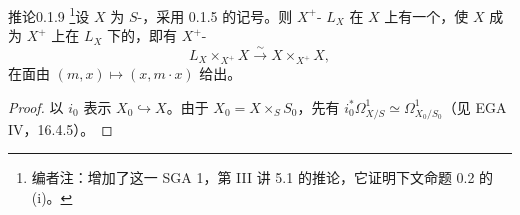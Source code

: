\begin{SGAresult}{推论}{0.1.9}
\footnote{编者注：增加了这一 SGA 1，第 III 讲 5.1 的推论，它证明下文命题 0.2 的 (i)。}设 $X$ 为 $S$-，采用 0.1.5 的记号。则 $X^+$- $L_X$ 在 $X$ 上有一个，使 $X$ 成为 $X^+$ 上在 $L_X$ 下的，即有 $X^+$-
\[L_X\times_{X^+}X\xrightarrow{\sim}X\times_{X^+}X,\]
在面由 $(m,x)\mapsto(x,m\cdot x)$ 给出。
\end{SGAresult}
\begin{proof}
以 $i_0$ 表示 $X_0\hookrightarrow X$。由于 $X_0=X\times_S S_0$，先有 $i_0^*\Omega^1_{X/S}\simeq\Omega^1_{X_0/S_0}$（见 EGA IV，16.4.5）。


\end{proof}
